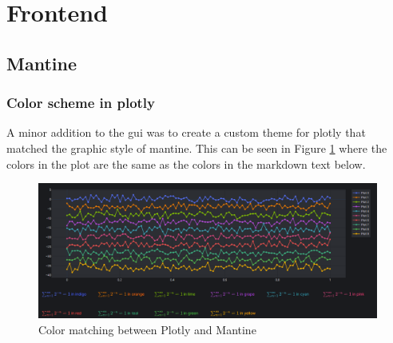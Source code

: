 \section{Frontend}
\subsection{Mantine}

\subsubsection{Color scheme in plotly}
A minor addition to the \gls{gui} was to create a custom theme for \gls{plotly} that matched the graphic style of \gls{mantine}.
This can be seen in Figure \ref{fig:color_matching} where the colors in the plot are the same as the colors in the \gls{markdown} text below.

\begin{figure}[H]
    \centering
    \includegraphics[width=\textwidth]{figures/gui/colors.png}
    \caption{Color matching between Plotly and Mantine}
    \label{fig:color_matching}
\end{figure}